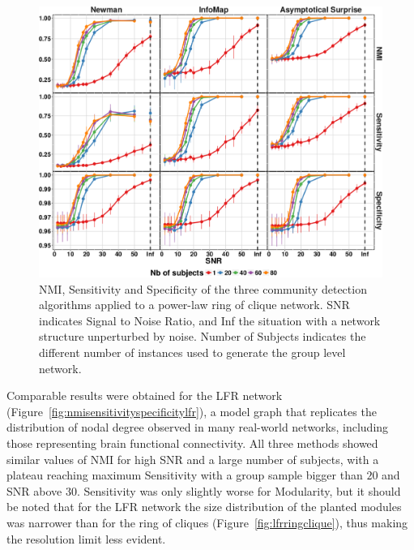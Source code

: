 \begin{figure}[!htb]
\includegraphics[width=\textwidth]{images/pacopaperfigure4.pdf}
\caption{NMI, Sensitivity and Specificity of the three community detection algorithms applied to a power-law ring of clique network. SNR indicates Signal to Noise Ratio, and Inf the situation with a network structure unperturbed by noise. Number of Subjects indicates the different number of instances used to generate the group level network.}
\label{fig:nmisensitivityspecificityringclique}
\end{figure}
Comparable results were obtained for the LFR network (Figure~\ref{fig:nmisensitivityspecificitylfr}), a model graph that replicates the distribution of nodal degree observed in many real-world networks, including those representing brain functional connectivity.
All three methods showed similar values of NMI for high SNR and a large number of subjects, with a plateau reaching maximum Sensitivity with a group sample bigger than $20$ and SNR above $30$.
Sensitivity was only slightly worse for Modularity, but it should be noted that for the LFR network the size distribution of the planted modules was narrower than for the ring of cliques (Figure~\ref{fig:lfrringclique}), thus making the resolution limit less evident.
